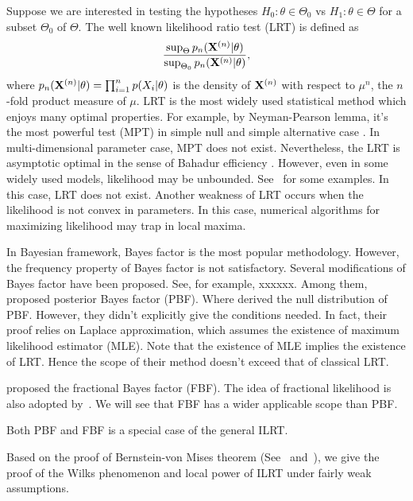 \documentclass[3p]{elsarticle}
\theoremstyle{plain}
\theoremstyle{definition}
\theoremstyle{remark}
\begin{document}
Suppose we are interested in  testing the hypotheses $H_0:\theta\in \Theta_0$ vs $H_1:\theta\in \Theta$ for a subset $\Theta_0$ of $\Theta$. The well known likelihood ratio test (LRT) is defined as
\begin{equation}
    \frac{\sup_{\Theta} p_n(\mathbf{X}^{(n)}|{\theta})}{\sup_{\Theta_0} p_n(\mathbf{X}^{(n)}|\theta)},
\end{equation}
where $p_n(\mathbf{X}^{(n)}|\theta)=\prod_{i=1}^n p(X_i|\theta)$ is the density of $\mathbf{X}^{(n)}$ with respect to $\mu^n$, the $n$-fold product measure of $\mu$.
LRT is the most widely used statistical method which enjoys many optimal properties. For example, by Neyman-Pearson lemma, it's the most powerful test (MPT) in simple null and simple alternative case \citep{Lehmann}.
In multi-dimensional parameter case, MPT does not exist.
Nevertheless, the LRT is asymptotic optimal in the sense of Bahadur efficiency \citep{MR0315820}.
However, even in some widely used models, likelihood may be unbounded. See~\cite{Cam1990Maximum} for some examples.
In this case, LRT does not exist. Another weakness of LRT occurs when the likelihood is not convex in parameters. In this case, numerical algorithms for maximizing likelihood may trap in local maxima. 


In Bayesian framework, Bayes factor is the most popular methodology.
However, the frequency property of Bayes factor is not satisfactory.
Several modifications of Bayes factor have been proposed.
See, for example, xxxxxx.
Among them, \cite{Aitkin1991Posterior} proposed posterior Bayes factor (PBF). Where
\cite{gelfand1993bayesian} derived the null distribution of PBF.
However, they didn't explicitly give the conditions needed. In fact, their proof relies on Laplace approximation, which assumes the existence of maximum likelihood estimator (MLE). 
Note that the existence of MLE implies the existence of LRT. Hence the scope of their method doesn't exceed that of classical LRT\@.

\cite{Fractional1995} proposed the fractional Bayes factor (FBF).
The idea of fractional likelihood is also adopted by~\cite{kar10563}.
We will see that FBF has a wider applicable scope than PBF.

Both PBF and FBF is a special case of the general ILRT.


Based on the proof of Bernstein-von Mises theorem (See~\cite{van2000asymptotic} and~\cite{Kleijn2012The}), we give the proof of the Wilks phenomenon and local power of ILRT under fairly weak assumptions.
\end{document}
